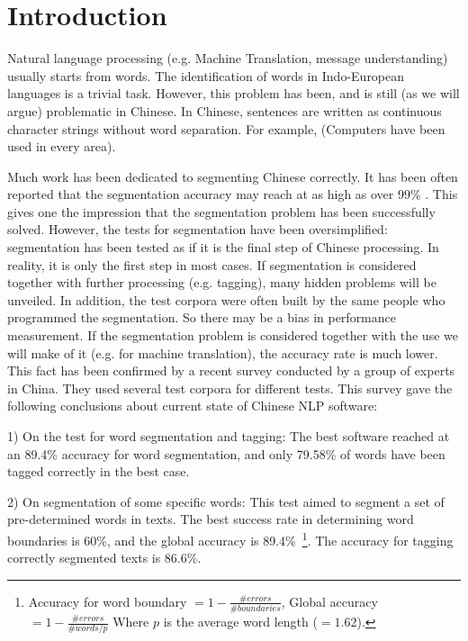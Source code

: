 



\maketitle

\section{Introduction}

Natural language processing (e.g. Machine Translation, message understanding) usually starts from words. The 
identification of words in Indo-European languages is a trivial task. However, this problem has been, and is still (as we 
will argue) problematic in Chinese. In Chinese, sentences are written as continuous character strings without word 
separation. For example,  (Computers have been used in every area). 

Much work has been dedicated to segmenting Chinese correctly. It has been often reported that the segmentation 
accuracy may reach at as high as over 99\% \cite{Chen92,Chiang92,Yeh91}.
This gives one the impression that the segmentation problem has 
been successfully solved. However, the tests for segmentation have been oversimplified: segmentation has been tested 
as if it is the final step of Chinese processing. In reality, it is only the 
first step in most cases.
If segmentation is considered together with further processing (e.g. 
tagging), many hidden problems will be unveiled. In addition, the test corpora were often built by the same people who 
programmed the segmentation. So there may be a bias in performance measurement. If the segmentation problem is 
considered together with the use we will make of it (e.g. for machine translation), the accuracy rate is much lower. This 
fact has been confirmed by a recent survey \cite{Liu96} conducted by a group of experts in China. They used several test corpora 
for different tests. This survey gave the following conclusions about current state of Chinese NLP software:

1) On the test for word segmentation and tagging:
The best software reached at an 89.4\% accuracy for word segmentation, and only 79.58\% of words have been 
tagged correctly in the best case.

2) On segmentation of some specific words:
This test aimed to segment a set of pre-determined words in texts. The best success rate in determining word boundaries is 60\%, and the global 
accuracy is 89.4\%~\footnote{Accuracy for word boundary $= 1 - \frac{\#errors}{\#boundaries}$, 
Global accuracy $= 1 - \frac{\#errors}{\#words / p}$
Where $p$ is the average word length ($=1.62$).}. 
The accuracy for tagging correctly segmented texts is 86.6\%.


